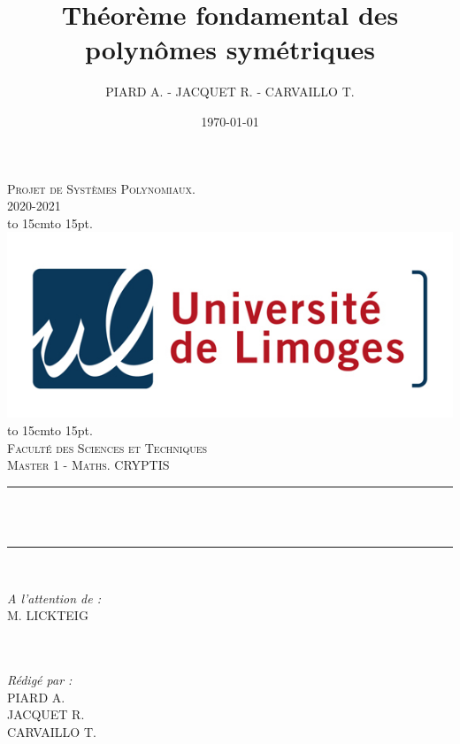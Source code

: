 \documentclass[12pt]{article}
\title{Théorème fondamental des polynômes symétriques}
\author{PIARD A. - JACQUET R. - CARVAILLO T.}
\date{\today}
\makeatletter
\let\thetitle\@title
\def\dotfill#1{\cleaders\hbox to #1{.}\hfill}
\newcommand\dotline[2][.5em]{\leavevmode\hbox to #2{\dotfill{#1}\hfil}}
\theoremstyle{remark}\newtheorem{note}{Note}
\theoremstyle{remark}\newtheorem{nota}{Notation}
\theoremstyle{definition}
\makeatother
\begin{document}

\begin{titlepage}
	\centering
    \vspace*{0.5 cm}
    \textsc{\LARGE Projet de Systèmes Polynomiaux.\\
    \vspace{12pt}
2020-2021}\\[1.0 cm]
    \dotline[15pt]{15cm}\\
	\includegraphics[scale = 2.2]{logo.png}
	\dotline[15pt]{15cm}\\
	\vspace{1.5cm}
	\textsc{\Large Faculté des Sciences et Techniques}\\
	\textsc{\large Master 1 - Maths. CRYPTIS}\\[1.0 cm]
	\rule{\linewidth}{0.2 mm} \\[0.4 cm]
	{ \huge \bfseries \color{blue} \thetitle}\\
	\rule{\linewidth}{0.2 mm} \\[1.5 cm]
	
	\begin{minipage}{0.4\textwidth}
		\begin{flushleft} \large
			\emph{A l'attention de :}\\
			M. LICKTEIG\\
			\phantom{a}\\
			\phantom{a}\\
		\end{flushleft}
	\end{minipage}
	\begin{minipage}{0.5\textwidth}
    	\begin{flushright} \large
		\emph{Rédigé par :}\\
		PIARD A.\\
		JACQUET R.\\
		CARVAILLO T.\\
		\end{flushright}
	\end{minipage}\\[2 cm]
\end{titlepage}
\end{document}
